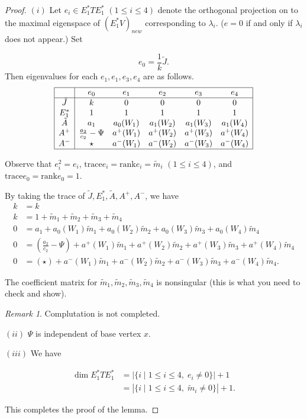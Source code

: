 \documentclass[
]{book}
\theoremstyle{definition}
\theoremstyle{definition}
\theoremstyle{definition}
\theoremstyle{definition}
\theoremstyle{remark}
\newtheorem*{remark}{Remark}
\begin{document}
\begin{proof}
\leavevmode

\((i)\) Let \(e_i\in E^*_1TE^*_1\) \((1\leq i\leq 4)\) denote the orthogonal projection on to the maximal eigenspace of \((E^*_1V)_{new}\) corresponding to \(\lambda_i\). (\(e=0\) if and only if \(\lambda_i\) does not appear.) Set

\[e_0 = \frac{1}{k}\tilde{J}.\]
Then eigenvalues for each \(e_1, e_1, e_3, e_4\) are as follows.
\[\begin{array}{|c|ccccc|} \hline
\text{} & e_0 & e_1 & e_2 & e_3 & e_4\\
\hline
\tilde{J} & k & 0 & 0 & 0 & 0\\
E^*_1 & 1 & 1 & 1 & 1 & 1 \\
\tilde{A} & a_1 & a_0(W_1) & a_1(W_2) & a_1(W_3) & a_1(W_4)\\
A^+ & \frac{a_2}{c_2}-\Psi & a^+(W_1)  & a^+(W_2)  & a^+(W_3)  & a^+(W_4)\\
A^- & \star & a^-(W_1)  & a^-(W_2)  & a^-(W_3)  & a^-(W_4)\\
\hline
\end{array}\]

Observe that \(e^2_i = e_i\), \(\mathrm{trace} e_i = \mathrm{rank}e_i = \tilde{m}_i\) \((1\leq i\leq 4)\), and \(\mathrm{trace} e_0 = \mathrm{rank}e_0 = 1\).

By taking the trace of \(\tilde{J}, E^*_1, \tilde{A}, A^+, A^-\), we have
\begin{align}
k & = k\\
k & = 1 + \tilde{m}_1 + \tilde{m}_2 + \tilde{m}_3 + \tilde{m}_4\\
0 & = a_1 + a_0(W_1)\tilde{m}_1 + a_0(W_2)\tilde{m}_2 + a_0(W_3)\tilde{m}_3 + a_0(W_4)\tilde{m}_4\\
0 & = \left(\frac{a_2}{c_2}-\Psi\right) + a^+(W_1)\tilde{m}_1 + a^+(W_2)\tilde{m}_2 + a^+(W_3)\tilde{m}_3 + a^+(W_4)\tilde{m}_4\\
0 & = \left(\star\right) + a^-(W_1)\tilde{m}_1 + a^-(W_2)\tilde{m}_2 + a^-(W_3)\tilde{m}_3 + a^-(W_4)\tilde{m}_4.
\end{align}

The coefficient matrix for \(\tilde{m}_1,\tilde{m}_2, \tilde{m}_3,\tilde{m}_4\) is nonsingular (this is what you need to check and show).

\begin{remark}
Complutation is not completed.
\end{remark}

\((ii)\) \(\Psi\) is independent of base vertex \(x\).

\((iii)\) We have

\begin{align}
\dim E^*_1TE^*_1 & = |\{i\mid 1\leq i\leq 4, \; e_i\neq 0\}| + 1\\
& = |\{i\mid 1\leq i\leq 4, \; \tilde{m}_i\neq 0\}| + 1.
\end{align}

This completes the proof of the lemma.

\end{proof}
\end{document}
